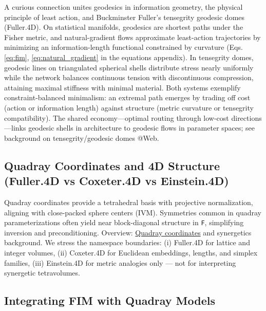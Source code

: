 \documentclass[
  10pt,
]{article}
\newcommand{\passthrough}[1]{#1}
\begin{document}
A curious connection unites geodesics in information geometry, the
physical principle of least action, and Buckminster Fuller's tensegrity
geodesic domes (Fuller.4D). On statistical manifolds, geodesics are
shortest paths under the Fisher metric, and natural-gradient flows
approximate least-action trajectories by minimizing an
information-length functional constrained by curvature (Eqs.
\eqref{eq:fim}, \eqref{eq:natural_gradient} in the equations appendix).
In tensegrity domes, geodesic lines on triangulated spherical shells
distribute stress nearly uniformly while the network balances continuous
tension with discontinuous compression, attaining maximal stiffness with
minimal material. Both systems exemplify constraint-balanced minimalism:
an extremal path emerges by trading off cost (action or information
length) against structure (metric curvature or tensegrity
compatibility). The shared economy---optimal routing through low-cost
directions---links geodesic shells in architecture to geodesic flows in
parameter spaces; see background on tensegrity/geodesic domes @Web.

\hypertarget{quadray-coordinates-and-4d-structure-fuller.4d-vs-coxeter.4d-vs-einstein.4d}{%
\subsection{Quadray Coordinates and 4D Structure (Fuller.4D vs
Coxeter.4D vs
Einstein.4D)}\label{quadray-coordinates-and-4d-structure-fuller.4d-vs-coxeter.4d-vs-einstein.4d}}

Quadray coordinates provide a tetrahedral basis with projective
normalization, aligning with close-packed sphere centers (IVM).
Symmetries common in quadray parameterizations often yield near
block-diagonal structure in \passthrough{\lstinline!F!}, simplifying
inversion and preconditioning. Overview:
\href{https://en.wikipedia.org/wiki/Quadray_coordinates}{Quadray
coordinates} and synergetics background. We stress the namespace
boundaries: (i) Fuller.4D for lattice and integer volumes, (ii)
Coxeter.4D for Euclidean embeddings, lengths, and simplex families,
(iii) Einstein.4D for metric analogies only --- not for interpreting
synergetic tetravolumes.

\hypertarget{integrating-fim-with-quadray-models}{%
\subsection{Integrating FIM with Quadray
Models}\label{integrating-fim-with-quadray-models}}
\end{document}
